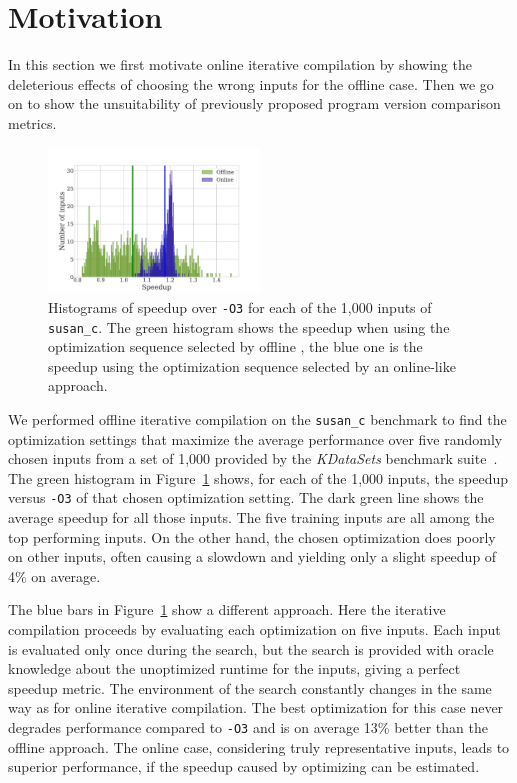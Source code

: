 \section{Motivation \label{sec:motivation}}

    In this section we first motivate online iterative compilation by showing the deleterious effects of choosing the wrong inputs for the
    offline case. Then we go on to show the unsuitability of previously proposed program version comparison metrics.

    \begin{figure}[t!]
        \centering
        \includegraphics[width=0.5\textwidth]{figs/motivation-online.pdf}
        \caption{
            Histograms of speedup over \texttt{-O3} for each of the 1,000 inputs of \texttt{susan\_c}. The green histogram shows the
            speedup when using the optimization sequence selected by offline \itercomp, the blue one is the speedup using the optimization
            sequence selected by an online-like approach.
        }
        \label{fig:motivation-online}
    \end{figure}

    We performed offline iterative compilation on the \texttt{susan\_c} benchmark to find the optimization settings that maximize the average performance
    over five randomly chosen inputs from a set of 1,000 provided by the \textit{KDataSets} benchmark suite~\cite{chen10,chen12a}.
    The green histogram in Figure~\ref{fig:motivation-online} shows, for each of the 1,000 inputs, the speedup versus \texttt{-O3} of that
    chosen optimization setting. The dark green line shows the average speedup for all those inputs. The five training inputs are
    all among the top performing inputs. On the other hand, the chosen optimization does poorly on other inputs, often causing
    a slowdown and yielding only a slight speedup of 4\% on average.

    The blue bars in Figure~\ref{fig:motivation-online} show a different approach. Here the iterative compilation proceeds by evaluating
    each optimization on five inputs. Each input is evaluated only once during the search, but the search is provided with oracle
    knowledge about the unoptimized runtime for the inputs, giving a perfect speedup metric. The environment of the search constantly
    changes in the same way as for online iterative compilation. The best optimization for this case never degrades performance compared to
    \texttt{-O3} and is on average 13\% better than the offline approach. The online case, considering truly representative inputs, leads
    to superior performance, if the speedup caused by optimizing can be estimated.

